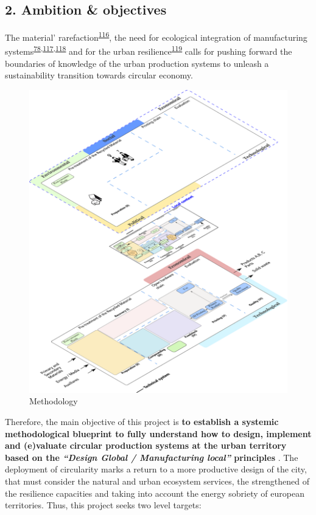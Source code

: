 \documentclass[
  12pt,
  a4paperpaper,
  onecolumn]{article}
\begin{document}
\hypertarget{ambition-objectives}{%
\subsection{2. Ambition \& objectives}\label{ambition-objectives}}

The material'
rarefaction\textsuperscript{\protect\hyperlink{ref-hultman2021}{116}},
the need for ecological integration of manufacturing
systems\textsuperscript{\protect\hyperlink{ref-Bakshi2019a}{78},\protect\hyperlink{ref-Bakshi2015}{117},\protect\hyperlink{ref-Saladini2018}{118}}
and for the urban
resilience\textsuperscript{\protect\hyperlink{ref-xu2021e}{119}} calls
for pushing forward the boundaries of knowledge of the urban production
systems to unleash a sustainability transition towards circular economy.

\begin{figure}
\centering
    \includegraphics[width=\linewidth]{Figures/Levels.png}
    \caption{Methodology}
    \label{fig:WPs}
\end{figure}

Therefore, the main objective of this project is \textbf{to establish a
systemic methodological blueprint to fully understand how to design,
implement and (e)valuate circular production systems at the urban
territory based on the \emph{``Design Global / Manufacturing local''}
principles }. The deployment of circularity marks a return to a more
productive design of the city, that must consider the natural and urban
ecosystem services, the strengthened of the resilience capacities and
taking into account the energy sobriety of european territories. Thus,
this project seeks two level targets:
\end{document}
